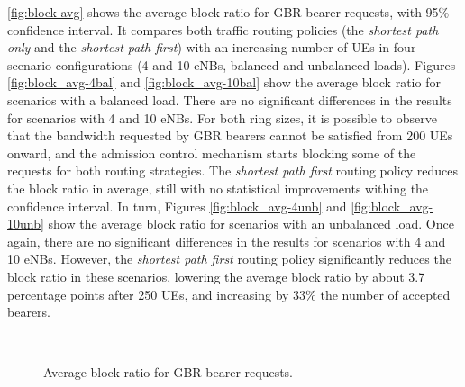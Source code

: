 \autoref{fig:block-avg} shows the average block ratio for \ac{GBR} bearer
requests, with 95\% confidence interval. It compares both traffic routing
policies (the \emph{shortest path only} and the \emph{shortest path first})
with an increasing number of \acp{UE} in four scenario configurations (4 and 10
\acp{eNB}, balanced and unbalanced loads). Figures \ref{fig:block_avg-4bal} and
\ref{fig:block_avg-10bal} show the average block ratio for scenarios with a
balanced load. There are no significant differences in the results for
scenarios with 4 and 10 \acp{eNB}. For both ring sizes, it is possible to
observe that the bandwidth requested by \ac{GBR} bearers cannot be satisfied
from 200 \acp{UE} onward, and the admission control mechanism starts blocking
some of the requests for both routing strategies. The \emph{shortest path
first} routing policy reduces the block ratio in average, still with no
statistical improvements withing the confidence interval. In turn, Figures
\ref{fig:block_avg-4unb} and \ref{fig:block_avg-10unb} show the average block
ratio for scenarios with an unbalanced load. Once again, there are no
significant differences in the results for scenarios with 4 and 10 \acp{eNB}.
However, the \emph{shortest path first} routing policy significantly reduces
the block ratio in these scenarios, lowering the average block ratio by about
3.7 percentage points after 250 \acp{UE}, and increasing by 33\% the number of
accepted bearers. 

\begin{figure}[htb]
  \centering
  \hfil
   \\
  \hfil
  \caption{Average block ratio for \ac{GBR} bearer requests.}
  \label{fig:block-avg}
\end{figure}

